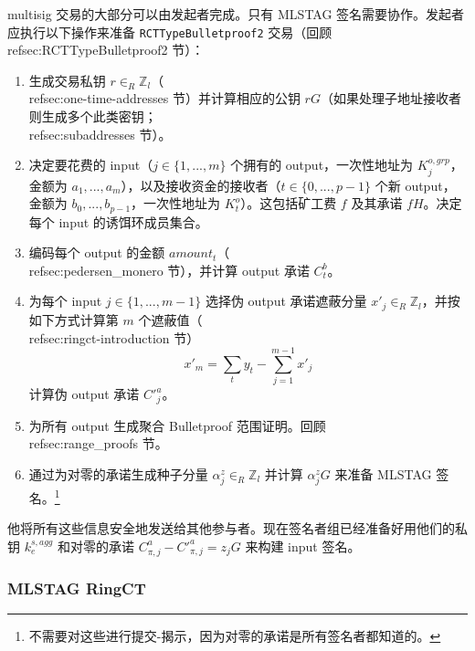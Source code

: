 multisig 交易的大部分可以由发起者完成。只有 MLSTAG 签名需要协作。发起者应执行以下操作来准备 {\tt RCTTypeBulletproof2} 交易（回顾 \\ref{sec:RCTTypeBulletproof2} 节）：
\begin{enumerate}
    \item 生成交易私钥 $r \in_R \mathbb{Z}_l$（\\ref{sec:one-time-addresses} 节）并计算相应的公钥 $r G$（如果处理子地址接收者则生成多个此类密钥；\\ref{sec:subaddresses} 节）。
    \item 决定要花费的 input（$j \in \{1,...,m\}$ 个拥有的 output，一次性地址为 $K^{o,grp}_j$，金额为 $a_1,...,a_m$），以及接收资金的接收者（$t \in \{0,...,p-1\}$ 个新 output，金额为 $b_0,...,b_{p-1}$，一次性地址为 $K^{o}_t$）。这包括矿工费 $f$ 及其承诺 $f H$。决定每个 input 的诱饵环成员集合。
    \item 编码每个 output 的金额 $\mathit{amount}_t$（\\ref{sec:pedersen_monero} 节），并计算 output 承诺 $C^b_t$。
    \item 为每个 input $j \in \{1,...,m-1\}$ 选择伪 output 承诺遮蔽分量 $x'_{j} \in_R \mathbb{Z}_l$，并按如下方式计算第 $m$ 个遮蔽值（\\ref{sec:ringct-introduction} 节）
    \[x'_m = \sum_t y_t - \sum_{j=1}^{m-1} x'_j\]
    计算伪 output 承诺 $C'^a_{j}$。
    \item 为所有 output 生成聚合 Bulletproof 范围证明。回顾 \\ref{sec:range_proofs} 节。
    \item 通过为对零的承诺生成种子分量 $\alpha^z_{j} \in_R \mathbb{Z}_l$ 并计算 $\alpha^z_{j} G$ 来准备 MLSTAG 签名。\footnote{不需要对这些进行提交-揭示，因为对零的承诺是所有签名者都知道的。}
\end{enumerate}

他将所有这些信息安全地发送给其他参与者。现在签名者组已经准备好用他们的私钥 $k^{s,agg}_e$ 和对零的承诺 $C^a_{\pi,j} - C'^a_{\pi,j} = z_j G$ 来构建 input 签名。

\subsubsection*{MLSTAG RingCT}

